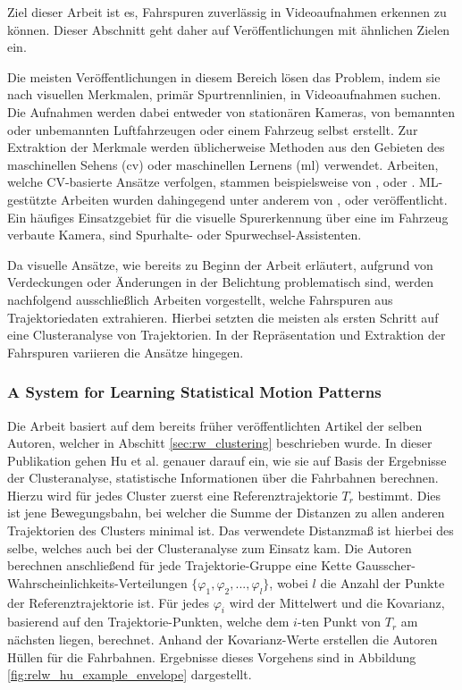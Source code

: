Ziel dieser Arbeit ist es, Fahrspuren zuverlässig in Videoaufnahmen erkennen zu können. Dieser Abschnitt
geht daher auf Veröffentlichungen mit ähnlichen Zielen ein.

Die meisten Veröffentlichungen in diesem Bereich lösen das Problem, indem sie nach visuellen Merkmalen,
primär Spurtrennlinien, in Videoaufnahmen suchen. Die Aufnahmen werden dabei entweder von stationären Kameras,
von bemannten oder unbemannten Luftfahrzeugen oder einem Fahrzeug selbst erstellt. Zur Extraktion der Merkmale werden
üblicherweise Methoden aus den Gebieten des maschinellen Sehens (\acrshort*{cv}) oder maschinellen Lernens (\acrshort*{ml}) verwendet.
Arbeiten, welche CV-basierte Ansätze verfolgen, stammen beispielsweise von \cite[]{Lai2000}, \cite[]{McCall2006} oder \cite[]{Aly2008}.
ML-gestützte Arbeiten wurden dahingegend unter anderem von \cite[]{Kim2008}, \cite[]{Gopalan2012} oder
\cite[]{Neven2018} veröffentlicht.
Ein häufiges Einsatzgebiet für die visuelle Spurerkennung über eine im Fahrzeug verbaute Kamera, sind Spurhalte- oder
Spurwechsel-Assistenten.

Da visuelle Ansätze, wie bereits zu Beginn der Arbeit erläutert, aufgrund von Verdeckungen oder Änderungen
in der Belichtung problematisch sind, werden nachfolgend ausschließlich Arbeiten vorgestellt, welche Fahrspuren
aus Trajektoriedaten extrahieren. Hierbei setzten die meisten als ersten Schritt auf eine Clusteranalyse von Trajektorien.
In der Repräsentation und Extraktion der Fahrspuren variieren die Ansätze hingegen.

\subsubsection*{A System for Learning Statistical Motion Patterns}
Die Arbeit \cite[]{WeimingHu2006} basiert auf dem bereits früher veröffentlichten Artikel \cite[]{Hu2005} der selben Autoren,
welcher in Abschitt \ref{sec:rw_clustering} beschrieben wurde. In dieser Publikation gehen Hu et al. genauer darauf ein, wie sie auf Basis
der Ergebnisse der Clusteranalyse, statistische Informationen über die Fahrbahnen berechnen.
Hierzu wird für jedes Cluster zuerst eine Referenztrajektorie $T_r$ bestimmt. Dies ist jene Bewegungsbahn,
bei welcher die Summe der Distanzen zu allen anderen Trajektorien des Clusters minimal ist. Das verwendete
Distanzmaß ist hierbei des selbe, welches auch bei der Clusteranalyse zum Einsatz kam.
Die Autoren berechnen anschließend für jede Trajektorie-Gruppe eine Kette Gausscher-Wahrscheinlichkeits-Verteilungen
$\{ \varphi_1, \varphi_2, ..., \varphi_l \}$, wobei $l$ die Anzahl der Punkte der Referenztrajektorie ist.
Für jedes $\varphi_i$ wird der Mittelwert und die Kovarianz, basierend auf den Trajektorie-Punkten, welche dem
$i$-ten Punkt von $T_r$ am nächsten liegen, berechnet.
Anhand der Kovarianz-Werte erstellen die Autoren Hüllen für die Fahrbahnen. Ergebnisse dieses Vorgehens sind in
Abbildung \ref{fig:relw_hu_example_envelope} dargestellt.


